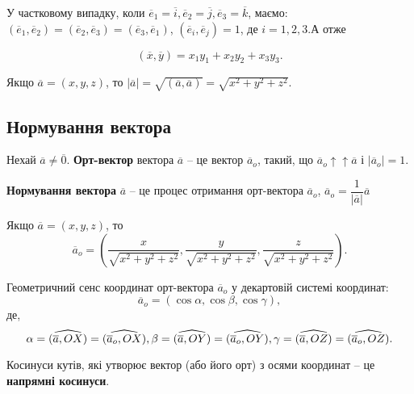У частковому випадку, коли $\overline{e}_1 = \overline{i}, \overline{e}_2 = \overline{j}, \overline{e}_3 = \overline{k}$, маємо: 
$(\overline{e}_1, \overline{e}_2) = (\overline{e}_2, \overline{e}_3) = (\overline{e}_3, \overline{e}_1)$, $(\overline{e}_i, \overline{e}_j) = 1$, де $i = 1, 2, 3$.А отже

\begin{equation*}
    (\overline{x}, \overline{y}) = x_1 y_1 + x_2 y_2 + x_3 y_3.
\end{equation*}

Якщо $\overline{a} = (x, y, z)$, то $|\overline{a}| = \sqrt{(\overline{a}, \overline{a})} = \sqrt{x^2 + y^2 + z^2}$.

\subsection{Нормування вектора}

\begin{definition}
	Нехай $\overline{a} \neq \overline{0}$. \textbf{Орт-вектор} вектора $\overline{a}$ -- це вектор $\overline{a}_o$, такий, що $\overline{a}_o \uparrow\uparrow \overline{a}$ і $|\overline{a}_o| = 1$. 
\end{definition}

\begin{definition}
	 \textbf{Нормування вектора} $\overline{a}$ -- це процес отримання орт-вектора $\overline{a}_o$, $\overline{a}_o = \dfrac{1}{|\overline{a}|}\overline{a}$
\end{definition}

Якщо $\overline{a} = (x, y, z)$, то
$$\overline{a}_o = \left(\dfrac{x}{\sqrt{x^2+y^2+z^2}}, \dfrac{y}{\sqrt{x^2+y^2+z^2}}, \dfrac{z}{\sqrt{x^2+y^2+z^2}} \right).$$

Геометричний сенс координат орт-вектора $\overline{a}_o$ у декартовій системі координат:
\begin{equation*}
    \overline{a}_o = (\cos\alpha, \cos\beta, \cos\gamma),
\end{equation*}
де,
\begin{equation*}    
    \alpha = \widehat{(\overline{a}, OX)} = \widehat{(\overline{a}_o, OX)},\\
    \beta = \widehat{(\overline{a}, OY)} = \widehat{(\overline{a}_o, OY)},\\
    \gamma = \widehat{(\overline{a}, OZ)} = \widehat{(\overline{a}_o, OZ)}.
\end{equation*}

\begin{definition}
	Косинуси кутів, які утворює вектор (або його орт) з осями координат -- це \textbf{напрямні косинуси}.
\end{definition}

